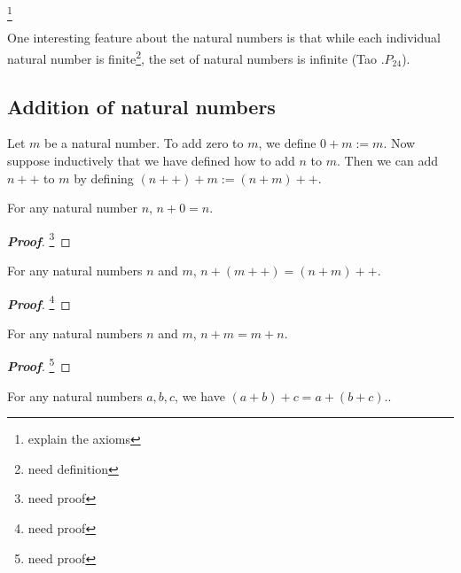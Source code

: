 \begin{remark}
\footnote{explain the axioms}
\end{remark}

\begin{remark}
One interesting feature about the natural numbers is that while each individual natural number is finite\footnote{need definition}, the set of natural numbers is infinite (Tao \cite{Tao_2006_1}.$P_{24}$).%
\end{remark}

\subsection{Addition of natural numbers}

\begin{definition}
Let $m$ be a natural number. To add zero to $m$, we define $0+m := m$. Now suppose inductively that we have defined how to add $n$ to $m$. Then we can add $n++$ to $m$ by defining $(n++)+m := (n+m)++$.
\end{definition}

\begin{lemma}
For any natural number $n$, $n+0 = n$.
\end{lemma}

\begin{proof}[\bf Proof]
\footnote{need proof}
\end{proof}

\begin{lemma}
For any natural numbers $n$ and $m$, $n+(m++) = (n+m)++$.
\end{lemma}

\begin{proof}[\bf Proof]
\footnote{need proof}
\end{proof}

\begin{proposition}\label{pro:addition_is_commutative_natural_number}
For any natural numbers $n$ and $m$, $n+m = m+n$.
\end{proposition}

\begin{proof}[\bf Proof]
\footnote{need proof}
\end{proof}

\begin{proposition}
For any natural numbers $a,b,c$, we have $(a+b) +c = a + (b+c)$..
\end{proposition}

